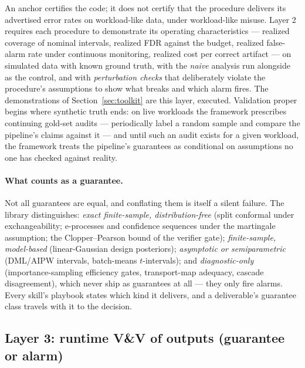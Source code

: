 \documentclass[11pt,a4paper]{article}
\begin{document}
An anchor certifies the code; it does not certify that the procedure
delivers its advertised error rates on workload-like data, under
workload-like misuse. Layer 2 requires each procedure to demonstrate its
operating characteristics --- realized coverage of nominal intervals,
realized FDR against the budget, realized false-alarm rate under
continuous monitoring, realized cost per correct artifact --- on simulated
data with known ground truth, with the \emph{naive} analysis run alongside
as the control, and with \emph{perturbation checks} that deliberately
violate the procedure's assumptions to show what breaks and which alarm
fires. The demonstrations of Section~\ref{sec:toolkit} are this layer,
executed. Validation proper begins where synthetic truth ends: on live
workloads the framework prescribes continuing gold-set audits ---
periodically label a random sample and compare the pipeline's claims
against it --- and until such an audit exists for a given workload, the
framework treats the pipeline's guarantees as conditional on assumptions
no one has checked against reality.

\paragraph{What counts as a guarantee.} Not all guarantees are equal, and
conflating them is itself a silent failure. The library distinguishes:
\emph{exact finite-sample, distribution-free} (split conformal under
exchangeability; e-processes and confidence sequences under the martingale
assumption; the Clopper--Pearson bound of the verifier gate);
\emph{finite-sample, model-based} (linear-Gaussian design posteriors);
\emph{asymptotic or semiparametric} (DML/AIPW intervals, batch-means
$t$-intervals); and \emph{diagnostic-only} (importance-sampling efficiency
gates, transport-map adequacy, cascade disagreement), which never ship as
guarantees at all --- they only fire alarms. Every skill's playbook states
which kind it delivers, and a deliverable's guarantee class travels with
it to the decision.

\subsection{Layer 3: runtime V\&V of outputs (guarantee or alarm)}
\end{document}
